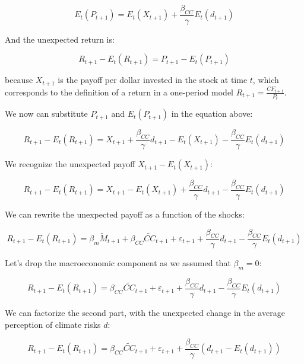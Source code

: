 \begin{equation}
    E_t(P_{t+1}) = E_t(X_{t+1}) + \frac{\beta_{CC}}{\gamma}E_t(d_{t+1})
\end{equation}

And the unexpected return is:

\begin{equation}
    R_{t+1} - E_t(R_{t+1}) = P_{t+1} - E_t(P_{t+1})
\end{equation}

because $X_{t+1}$ is the payoff per dollar invested in the stock at time $t$,
which corresponds to the definition of a return in a 
one-period model $R_{t+1} = \frac{CF_{t+1}}{P_t}$.

We now can substitute $P_{t+1}$ and $E_t(P_{t+1})$ in the equation above:

\begin{equation}
    R_{t+1} - E_t(R_{t+1}) = X_{t+1} + \frac{\beta_{CC}}{\gamma}d_{t+1} - E_t(X_{t+1}) - \frac{\beta_{CC}}{\gamma}E_t(d_{t+1})
\end{equation}

We recognize the unexpected payoff $X_{t+1} - E_t(X_{t+1})$:

\begin{equation}
    R_{t+1} - E_t(R_{t+1}) = X_{t+1} - E_t(X_{t+1}) + \frac{\beta_{CC}}{\gamma}d_{t+1} - \frac{\beta_{CC}}{\gamma}E_t(d_{t+1})
\end{equation}

We can rewrite the unexpected payoff as a function of the shocks:

\begin{equation}
    R_{t+1} - E_t(R_{t+1}) = \beta_m \tilde{M}_{t+1} + \beta_{CC} \tilde{CC}_{t+1} + \varepsilon_{t+1} + \frac{\beta_{CC}}{\gamma}d_{t+1} - \frac{\beta_{CC}}{\gamma}E_t(d_{t+1})
\end{equation}

Let's drop the macroeconomic component as 
we assumed that $\beta_m = 0$:

\begin{equation}
    R_{t+1} - E_t(R_{t+1}) = \beta_{CC} \tilde{CC}_{t+1} + \varepsilon_{t+1} + \frac{\beta_{CC}}{\gamma}d_{t+1} - \frac{\beta_{CC}}{\gamma}E_t(d_{t+1})
\end{equation}

We can factorize the second part, with
the unexpected change in the average perception of climate risks $d$:

\begin{equation}
    R_{t+1} - E_t(R_{t+1}) = \beta_{CC} \tilde{CC}_{t+1} + \varepsilon_{t+1} + \frac{\beta_{CC}}{\gamma}(d_{t+1} - E_t(d_{t+1}))
\end{equation}

